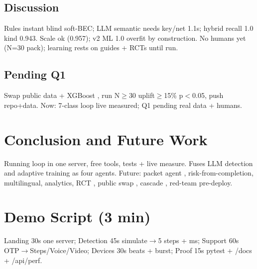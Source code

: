 \documentclass[11pt,a4paper]{article}
\begin{document}
\subsection{Discussion}
Rules instant blind soft-BEC; LLM semantic needs key/net 1.1s; hybrid recall 1.0 kind 0.943. Scale ok (0.957); v2 ML 1.0 overfit by construction. No humans yet (N=30 pack); learning rests on guides + RCTs \cite{Pardos24,TutorCopilot24,Lain24} until run.
\subsection{Pending Q1}
Swap public data + XGBoost \cite{FinFraud25}, run N$\ge$30 uplift$\ge$15\% p$<$0.05, push repo+data. Now: 7-class loop live measured; Q1 pending real data + humans.
\section{Conclusion and Future Work}
Running loop in one server, free tools, tests + live measure. Fuses LLM detection \cite{Heiding24,Koide24} and adaptive training \cite{SchoniCHI25,Greco25} as four agents. Future: packet agent \cite{Rigaki24}, risk-from-completion, multilingual, analytics, RCT \cite{SchoniCHI25,Greco25,Pardos24}, public swap \cite{FinFraud25,FraudR125}, cascade \cite{CLASP25}, red-team \cite{SecEval225,AgentHarm25} pre-deploy.
\appendix
\section{Demo Script (3 min)}
Landing 30s one server; Detection 45s simulate$\rightarrow$5 steps + ms; Support 60s OTP$\rightarrow$Steps/Voice/Video; Devices 30s beats + burst; Proof 15s pytest + /docs + /api/perf.
\end{document}
